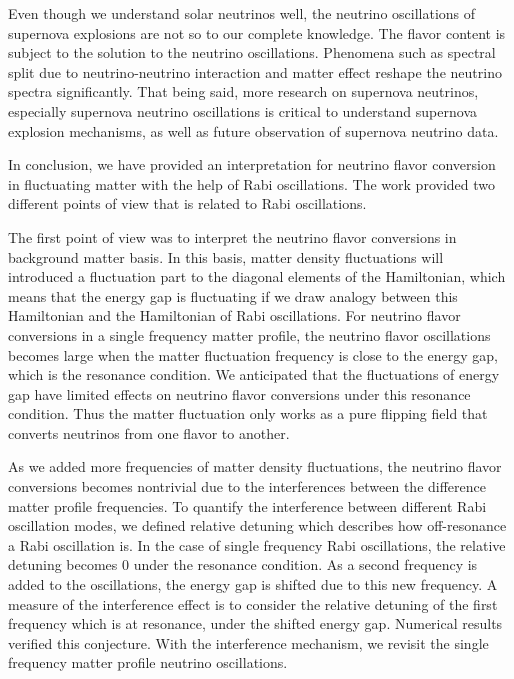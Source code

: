 

Even though we understand solar neutrinos well, the neutrino oscillations of supernova explosions are not so to our complete knowledge. The flavor content is subject to the solution to the neutrino oscillations. Phenomena such as spectral split due to neutrino-neutrino interaction and matter effect reshape the neutrino spectra significantly. That being said, more research on supernova neutrinos, especially supernova neutrino oscillations is critical to understand supernova explosion mechanisms, as well as future observation of supernova neutrino data.


In conclusion, we have provided an interpretation for neutrino flavor conversion in fluctuating matter with the help of Rabi oscillations. The work provided two different points of view that is related to Rabi oscillations.

The first point of view was to interpret the neutrino flavor conversions in background matter basis. In this basis, matter density fluctuations will introduced a fluctuation part to the diagonal elements of the Hamiltonian, which means that the energy gap is fluctuating if we draw analogy between this Hamiltonian and the Hamiltonian of Rabi oscillations. For neutrino flavor conversions in a single frequency matter profile, the neutrino flavor oscillations becomes large when the matter fluctuation frequency is close to the energy gap, which is the resonance condition. We anticipated that the fluctuations of energy gap have limited effects on neutrino flavor conversions under this resonance condition. Thus the matter fluctuation only works as a pure flipping field that converts neutrinos from one flavor to another.

As we added more frequencies of matter density fluctuations, the neutrino flavor conversions becomes nontrivial due to the interferences between the difference matter profile frequencies. To quantify the interference between different Rabi oscillation modes, we defined relative detuning which describes how off-resonance a Rabi oscillation is. In the case of single frequency Rabi oscillations, the relative detuning becomes $0$ under the resonance condition. As a second frequency is added to the oscillations, the energy gap is shifted due to this new frequency. A measure of the interference effect is to consider the relative detuning of the first frequency which is at resonance, under the shifted energy gap. Numerical results verified this conjecture. With the interference mechanism, we revisit the single frequency matter profile neutrino oscillations.

